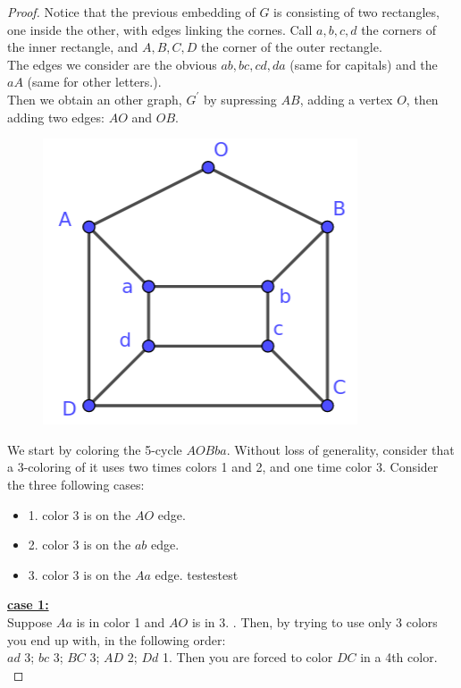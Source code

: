 \documentclass[12pt]{article}
\begin{document}
\begin{proof}
    Notice that the previous embedding of $G$ is consisting of two rectangles, one inside the other, with edges linking the cornes. 
    Call $a, b, c, d$ the corners of the inner rectangle, and $A, B, C, D$ the corner of the outer rectangle.\\
    The edges we consider are the obvious $ab, bc, cd, da$ (same for capitals) and the $aA$ (same for other letters.).\\
    Then we obtain an other graph, $G^'$ by supressing $AB$, adding a vertex $O$, then adding two edges: $AO$ and $OB$.\\

    \begin{figure}[h]
        \centering
        \includegraphics[scale=0.4]{tex_images/Gprime_uncolored.png}
    \end{figure}

    We start by coloring the 5-cycle $AOBba$. Without loss of generality, consider that a 3-coloring of it uses two times colors 1 and 2, and one time color 3. Consider the three following cases:
    \begin{itemize}
        \item 1. color 3 is on the $AO$ edge.
        \item 2. color 3 is on the $ab$ edge.
        \item 3. color 3 is on the $Aa$ edge. testestest
    \end{itemize}

    \textbf{\underline{case 1:}} \\
    Suppose $Aa$ is in color 1 and $AO$ is in 3.  . Then, by trying to use only 3 colors you end up with, in the following order: \\
    $ad$ 3; $bc$ 3; $BC$ 3; $AD$ 2; $Dd$ 1. Then you are forced to color $DC$ in a 4th color. \\


\end{proof}
\end{document}
